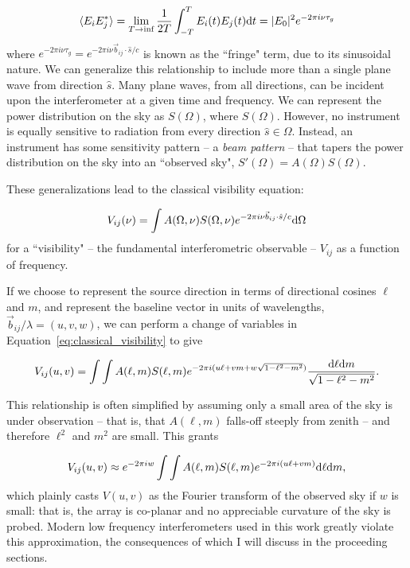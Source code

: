 \begin{equation}
\langle E_i E_j^* \rangle 
= \lim_{T\rightarrow\inf}\frac{1}{2T}\int^T_{-T} E_i(t) E_j(t) {\rm d}t
= | E_0 |^2 e^{-2\pi i \nu \tau_g}
\end{equation}
where $e^{-2\pi i \nu \tau_g} = e^{-2\pi i \nu \vec{b}_{ij}\cdot\hat{s}/c}$ is known as the ``fringe" term, due to its sinusoidal nature. We can generalize this relationship to include more than a single plane wave from direction $\hat{s}$. Many plane waves, from all directions, can be incident upon the interferometer at a given time and frequency. We can represent the power distribution on the sky as $S(\Omega)$, where $S(\Omega)$. However, no instrument is equally sensitive to radiation from every direction $\hat{s} \in \Omega$. Instead, an instrument has some sensitivity pattern -- a \textit{beam pattern} -- that tapers the power distribution on the sky into an ``observed sky",  $S'(\Omega) = A(\Omega)S(\Omega)$. 

These generalizations lead to the classical visibility equation:

\begin{equation}
V_{ij}(\nu) = \int A(\Omega, \nu) S(\Omega, \nu) e^{-2\pi i \nu \vec{b}_{ij}\cdot\hat{s}/c} {\rm d}\Omega
\label{eq:classical_visibility}
\end{equation}
for a ``visibility" -- the fundamental interferometric observable -- $V_{ij}$ as a function of frequency.

If we choose to represent the source direction in terms of directional cosines $\ell$ and $m$, and represent the baseline vector in units of wavelengths, $\vec{b}_{ij}/\lambda=(u,v,w)$, we can perform a change of variables in Equation~\ref{eq:classical_visibility} to give

\begin{equation}
V_{ij}(u,v) = \int\int A(\ell, m)S(\ell, m) e^{-2\pi i (u\ell + vm + w\sqrt{1 - \ell^2 - m^2})} \frac{ {\rm d}\ell {\rm d}m }{\sqrt{1 - \ell^2 - m^2}}.
\label{eq:vis_def_widefield}
\end{equation}

This relationship is often simplified by assuming only a small area of the sky is under observation -- that is, that $A(\ell,m)$ falls-off steeply from zenith -- and therefore $\ell^2$ and $m^2$ are small. This grants

\begin{equation}
V_{ij}(u,v) \approx e^{-2\pi i w} \int\int A(\ell, m)S(\ell, m) e^{-2\pi i (u\ell + vm)} {\rm d}\ell {\rm d}m,
\label{eq:vis_dev_narrowfield}
\end{equation}
which plainly casts $V(u,v)$ as the Fourier transform of the observed sky if $w$ is small: that is, the array is co-planar and no appreciable curvature of the sky is probed. Modern low frequency interferometers used in this work greatly violate this approximation, the consequences of which I will discuss in the proceeding sections.

